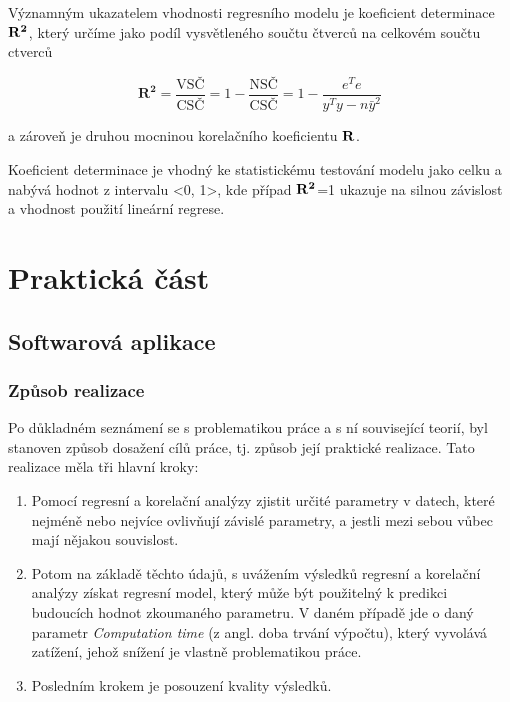 \documentclass[a4paper,12pt,twoside]{scrreprt}
\begin{document}
Významným ukazatelem vhodnosti regresního modelu je koeficient determinace $\bf{R^2}$, který určíme jako podíl vysvětleného součtu čtverců na celkovém součtu ctverců

\begin{equation}
\mathbf{R^2} = \frac{\text{VSČ}}{\text{CSČ}} = 1 - \frac{\text{NSČ}}{\text{CSČ}} = 1 - \frac{e^Te}{y^Ty - n\bar{y}^2}
\end{equation}

a zároveň je druhou mocninou korelačního koeficientu $\bf{R}$. 

Koeficient determinace je vhodný ke statistickému testování modelu jako celku a nabývá hodnot z intervalu <0, 1>, kde případ $\bf{R}^2$=1 ukazuje na silnou závislost a vhodnost použití lineární regrese. \cite{fiala} 

\chapter{Praktická část}
\section{Softwarová aplikace}
\subsection{Způsob realizace}

Po důkladném seznámení se s problematikou práce a s ní související teorií, byl stanoven způsob dosažení cílů práce, tj. způsob její praktické realizace. Tato realizace měla tři hlavní kroky:

\begin{enumerate}
\item Pomocí regresní a korelační analýzy zjistit určité parametry v datech, které nejméně nebo nejvíce ovlivňují závislé parametry, a jestli mezi sebou vůbec mají nějakou souvislost. 

\item Potom na základě těchto údajů, s uvážením výsledků regresní a korelační analýzy získat regresní model, který může být použitelný k predikci budoucích hodnot zkoumaného parametru. V daném případě jde o daný parametr \textit{Computation time} (z angl. doba trvání výpočtu), který vyvolává zatížení, jehož snížení je vlastně problematikou práce.

\item Posledním krokem je posouzení kvality výsledků.	
\end{enumerate}
 
\end{document}
